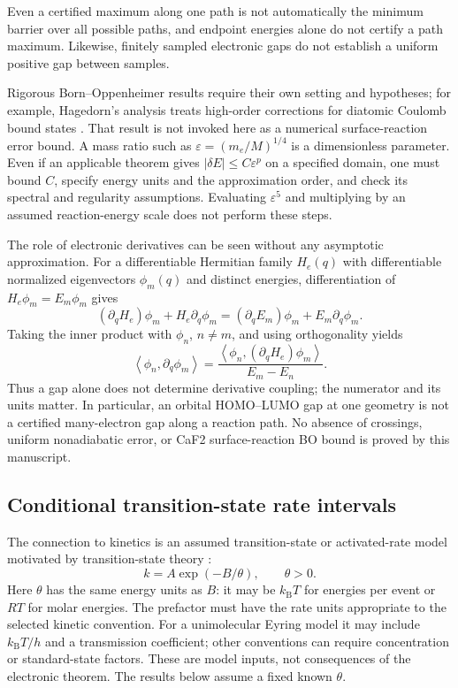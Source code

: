 \documentclass[11pt,a4paper]{article}
\theoremstyle{plain}
\theoremstyle{definition}
\theoremstyle{remark}
\newcommand{\ip}[2]{\left\langle #1,#2\right\rangle}
\begin{document}
Even a certified maximum along one path is not automatically the minimum
barrier over all possible paths, and endpoint energies alone do not certify
a path maximum. Likewise, finitely sampled electronic gaps do not establish
a uniform positive gap between samples.

Rigorous Born--Oppenheimer results require their own setting and hypotheses;
for example, Hagedorn's analysis treats high-order corrections for diatomic
Coulomb bound states \citep{Hagedorn1988}. That result is not invoked here
as a numerical surface-reaction error bound. A mass ratio such as
$\varepsilon=(m_e/M)^{1/4}$ is a dimensionless parameter. Even if an
applicable theorem gives $|\delta E|\le C\varepsilon^p$ on a specified
domain, one must bound $C$, specify energy units and the approximation order,
and check its spectral and regularity assumptions. Evaluating
$\varepsilon^5$ and multiplying by an assumed reaction-energy scale does
not perform these steps.

The role of electronic derivatives can be seen without any asymptotic
approximation. For a differentiable Hermitian family $H_e(q)$ with
differentiable normalized eigenvectors $\phi_m(q)$ and distinct energies,
differentiation of $H_e\phi_m=E_m\phi_m$ gives
\[
 (\partial_q H_e)\phi_m+H_e\partial_q\phi_m
 =(\partial_qE_m)\phi_m+E_m\partial_q\phi_m.
\]
Taking the inner product with $\phi_n$, $n\ne m$, and using
orthogonality yields
\begin{equation}
 \ip{\phi_n}{\partial_q\phi_m}
 =\frac{\ip{\phi_n}{(\partial_qH_e)\phi_m}}{E_m-E_n}.
 \label{eq:derivative-coupling}
\end{equation}
Thus a gap alone does not determine derivative coupling; the numerator and
its units matter. In particular, an orbital HOMO--LUMO gap at one geometry
is not a certified many-electron gap along a reaction path. No absence of
crossings, uniform nonadiabatic error, or CaF2 surface-reaction BO bound is
proved by this manuscript.

\subsection{Conditional transition-state rate intervals}
The connection to kinetics is an assumed transition-state or activated-rate
model motivated by transition-state theory \citep{Eyring1935}:
\begin{equation}
 k=A\exp(-B/\theta),\qquad \theta>0.
 \label{eq:tst}
\end{equation}
Here $\theta$ has the same energy units as $B$: it may be $k_{\mathrm B}T$
for energies per event or $RT$ for molar energies. The prefactor must have
the rate units appropriate to the selected kinetic convention. For a
unimolecular Eyring model it may include $k_{\mathrm B}T/h$ and a
transmission coefficient; other conventions can require concentration or
standard-state factors. These are model inputs, not consequences of the
electronic theorem. The results below assume a fixed known $\theta$.
\end{document}
